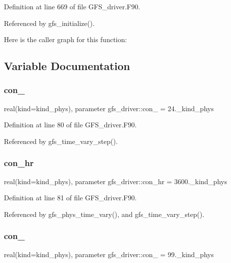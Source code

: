 Definition at line 669 of file G\+F\+S\+\_\+driver.\+F90.



Referenced by gfs\+\_\+initialize().

Here is the caller graph for this function\+:


\subsection{Variable Documentation}
\mbox{\label{namespacegfs__driver_a361be517e7eafe75c98c0676d08468d3}} 
\subsubsection{con\+\_}
{\footnotesize\ttfamily real(kind=kind\+\_\+phys), parameter gfs\+\_\+driver\+::con\+\_ = 24.\+\_\+kind\+\_\+phys\hspace{0.3cm}{\ttfamily [private]}}



Definition at line 80 of file G\+F\+S\+\_\+driver.\+F90.



Referenced by gfs\+\_\+time\+\_\+vary\+\_\+step().

\mbox{\label{namespacegfs__driver_aa73c08b478e9f3b45e36e4a5877dfa96}} 
\subsubsection{con\+\_\+hr}
{\footnotesize\ttfamily real(kind=kind\+\_\+phys), parameter gfs\+\_\+driver\+::con\+\_\+hr = 3600.\+\_\+kind\+\_\+phys\hspace{0.3cm}{\ttfamily [private]}}



Definition at line 81 of file G\+F\+S\+\_\+driver.\+F90.



Referenced by gfs\+\_\+phys\+\_\+time\+\_\+vary(), and gfs\+\_\+time\+\_\+vary\+\_\+step().

\mbox{\label{namespacegfs__driver_a741fe74ab1500b05fa747a711e74610e}} 
\subsubsection{con\+\_}
{\footnotesize\ttfamily real(kind=kind\+\_\+phys), parameter gfs\+\_\+driver\+::con\+\_ = 99.\+\_\+kind\+\_\+phys\hspace{0.3cm}{\ttfamily [private]}}



